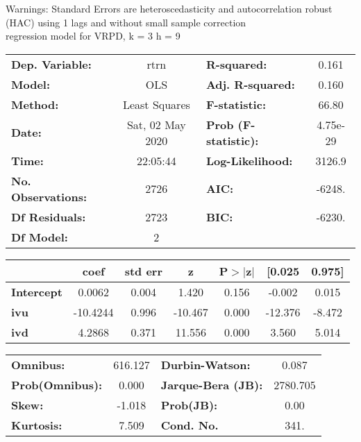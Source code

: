 Warnings: \newline
 [1] Standard Errors are heteroscedasticity and autocorrelation robust (HAC) using 1 lags and without small sample correction\\ 

regression model for VRPD, k = 3 h = 9\begin{center}
\begin{tabular}{lclc}
\toprule
\textbf{Dep. Variable:}    &       rtrn       & \textbf{  R-squared:         } &     0.161   \\
\textbf{Model:}            &       OLS        & \textbf{  Adj. R-squared:    } &     0.160   \\
\textbf{Method:}           &  Least Squares   & \textbf{  F-statistic:       } &     66.80   \\
\textbf{Date:}             & Sat, 02 May 2020 & \textbf{  Prob (F-statistic):} &  4.75e-29   \\
\textbf{Time:}             &     22:05:44     & \textbf{  Log-Likelihood:    } &    3126.9   \\
\textbf{No. Observations:} &        2726      & \textbf{  AIC:               } &    -6248.   \\
\textbf{Df Residuals:}     &        2723      & \textbf{  BIC:               } &    -6230.   \\
\textbf{Df Model:}         &           2      & \textbf{                     } &             \\
\bottomrule
\end{tabular}
\begin{tabular}{lcccccc}
                   & \textbf{coef} & \textbf{std err} & \textbf{z} & \textbf{P$> |$z$|$} & \textbf{[0.025} & \textbf{0.975]}  \\
\midrule
\textbf{Intercept} &       0.0062  &        0.004     &     1.420  &         0.156        &       -0.002    &        0.015     \\
\textbf{ivu}       &     -10.4244  &        0.996     &   -10.467  &         0.000        &      -12.376    &       -8.472     \\
\textbf{ivd}       &       4.2868  &        0.371     &    11.556  &         0.000        &        3.560    &        5.014     \\
\bottomrule
\end{tabular}
\begin{tabular}{lclc}
\textbf{Omnibus:}       & 616.127 & \textbf{  Durbin-Watson:     } &    0.087  \\
\textbf{Prob(Omnibus):} &   0.000 & \textbf{  Jarque-Bera (JB):  } & 2780.705  \\
\textbf{Skew:}          &  -1.018 & \textbf{  Prob(JB):          } &     0.00  \\
\textbf{Kurtosis:}      &   7.509 & \textbf{  Cond. No.          } &     341.  \\
\bottomrule
\end{tabular}
\end{center}

